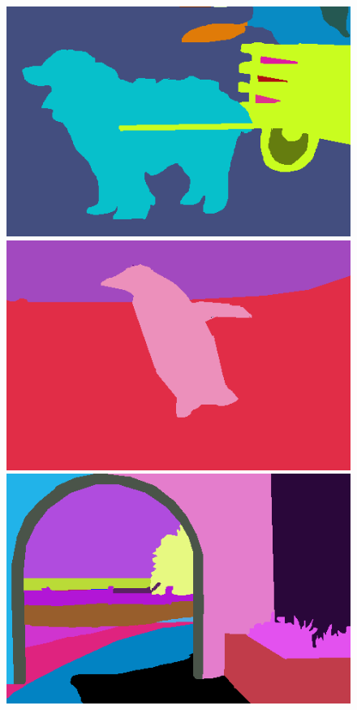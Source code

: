 \begin{figure}[h]
{\begin{minipage}[b]{0.13\linewidth}
\includegraphics[width=1\linewidth]{figures/img/gt/gt_247012.png}
\includegraphics[width=1\linewidth]{figures/img/gt/gt_106005.png}
\includegraphics[width=1\linewidth]{figures/img/gt/gt_5096.png}

\end{minipage}}
\end{figure}
